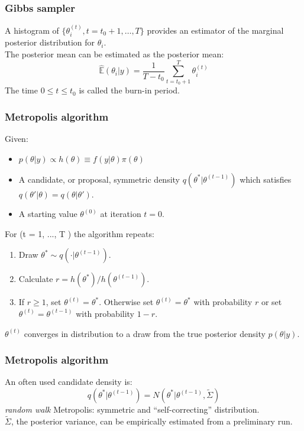 \documentclass{beamer}
\newcommand{\E}{\mathbb{E}}
\newcommand{\1}{\ensuremath{\mathbf{1}}}
\begin{document}
%
%
%
\begin{frame}\frametitle{Gibbs sampler}
	A histogram of $\{\theta_i^{(t)},t = t_0 +1,\ldots,T\}$ provides an estimator of the marginal posterior distribution for $\theta_i$.\\[2ex]
	The posterior mean can be estimated as the posterior mean:
	\begin{equation}
		\hat{\E}(\theta_i|y) = \frac{1}{T-t_0}\sum_{t=t_0+1}^T \theta_i^{(t)}
	\end{equation}
	The time $0 \leq t \leq t_0$ is called the burn-in period.
\end{frame}
%
%
%
\begin{frame}\frametitle{Metropolis algorithm}
	Given:
	\begin{itemize}
		\item $p(\theta|y) \propto h(\theta) \equiv f(y|\theta) \pi(\theta)$
		\item A candidate, or proposal, symmetric density $q(\theta^*|\theta^{(t-1)})$ which satisfies $q(\theta'|\theta) = q(\theta|\theta')$.
		\item A starting value $\theta^{(0)}$ at iteration $t = 0$.
	\end{itemize}
	For (t = 1, ..., T ) the algorithm repeats:
	\begin{enumerate}
		\item Draw $\theta^* \sim q(\cdot|\theta^{(t-1)})$.
		\item Calculate $r = h(\theta^*)/h(\theta^{(t-1)})$.
		\item If $r \geq 1$, set $\theta^{(t)} = \theta^*$. Otherwise set $\theta^{(t)} = \theta^*$ with probability $r$ or set $\theta^{(t)} = \theta^{(t-1)}$ with probability $1-r$.
	\end{enumerate}
	$\theta^{(t)}$ converges in distribution to a draw from the true posterior density $p(\theta|y)$.
\end{frame}
%
%
%
\begin{frame}\frametitle{Metropolis algorithm}
	An often used candidate density is:
	\begin{equation}
		q(\theta^*|\theta^{(t-1)}) = N(\theta^*|\theta^{(t-1)},\tilde{\Sigma})
	\end{equation}
	\emph{random walk} Metropolis: symmetric and ``self-correcting'' distribution.\\[2ex]
	$\tilde{\Sigma}$, the posterior variance, can be empirically estimated from a preliminary run.
\end{frame}
\end{document}
